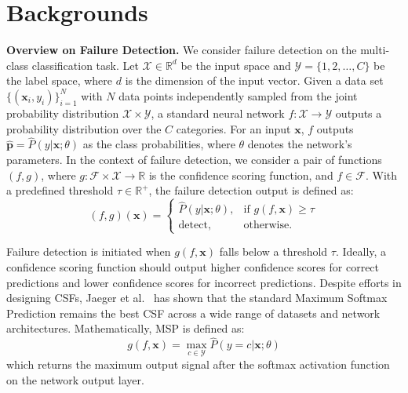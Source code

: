 \section{Backgrounds}

\textbf{Overview on Failure Detection. } We consider failure detection on the multi-class classification task. 
Let $\mathcal{X} \in \mathbb{R}^d$ be the input space and $\mathcal{Y} = \{ 1, 2, \dots, C \}$ be the label space, where $d$ is the dimension of the input vector.
Given a data set $\{ (\mathbf{x}_i, y_i) \}_{i=1}^N$ with $N$ data points independently sampled from the joint probability distribution $\mathcal{X} \times \mathcal{Y}$, a standard neural network $f: \mathcal{X} \rightarrow \mathcal{Y}$ outputs a probability distribution over the $C$ categories.
For an input $\mathbf{x}$, $f$ outputs $\boldsymbol{\hat{p}} = \hat{P}(y|\mathbf{x};\theta)$ as the class probabilities, where $\theta$ denotes the network's parameters.
In the context of failure detection, we consider a pair of functions $(f, g)$, where $g: \mathcal{F} \times \mathcal{X} \rightarrow \mathbb{R}$ is the confidence scoring function, and $f \in \mathcal{F}$.
With a predefined threshold $\tau \in \mathbb{R}^+$, the failure detection output is defined as:
\begin{equation}
    (f,g)(\mathbf{x}) = 
    \begin{cases}
   \hat{P}(y|\mathbf{x};\theta), & \text{if } g(f, \mathbf{x}) \geq \tau \\
    \text{detect},              & \text{otherwise.}
\end{cases}
\end{equation}

Failure detection is initiated when $g(f, \mathbf{x})$ falls below a threshold $\tau$. 
Ideally, a confidence scoring function should output higher confidence scores for correct predictions and lower confidence scores for incorrect predictions.
Despite efforts in designing CSFs, Jaeger et al.~\cite{jaeger2023a} has shown that the standard Maximum Softmax Prediction remains the best CSF across a wide range of datasets and network architectures. 
Mathematically, MSP is defined as:
\begin{equation}
    g(f, \mathbf{x}) = \max_{c\in\mathcal{Y}} \hat{P}(y=c|\mathbf{x};\theta)
\end{equation}
which returns the maximum output signal after the softmax activation function on the network output layer.

